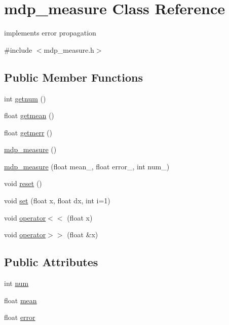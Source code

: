 \hypertarget{classmdp__measure}{
\section{mdp\_\-measure Class Reference}
\label{classmdp__measure}
}


implements error propagation  


{\ttfamily \#include $<$mdp\_\-measure.h$>$}\subsection*{Public Member Functions}
\begin{DoxyCompactItemize}
\item 
int \hyperlink{classmdp__measure_af4311b3d6f7aeedd30df26c805df74d9}{getnum} ()
\item 
float \hyperlink{classmdp__measure_a6ac1b96bc356ea6b614a672b06dab833}{getmean} ()
\item 
float \hyperlink{classmdp__measure_a7661cd0bdff2e5f4a2054ef5c3446cb1}{getmerr} ()
\item 
\hyperlink{classmdp__measure_a27caa03e148574a5e3e13b587212bc6a}{mdp\_\-measure} ()
\item 
\hyperlink{classmdp__measure_a861159da4e045611fa06b937c63d91ab}{mdp\_\-measure} (float mean\_\-, float error\_\-, int num\_)
\item 
void \hyperlink{classmdp__measure_ae03b11fdcba09eefb70134030b863cf6}{reset} ()
\item 
void \hyperlink{classmdp__measure_a5f6d47b2303eea323f511019404621a2}{set} (float x, float dx, int i=1)
\item 
void \hyperlink{classmdp__measure_ad1714e31ad9a1473c05f4aeeab9634e4}{operator$<$$<$} (float x)
\item 
void \hyperlink{classmdp__measure_a3d8873e8abbae44011ddcd69d23e0c9d}{operator$>$$>$} (float \&x)
\end{DoxyCompactItemize}
\subsection*{Public Attributes}
\begin{DoxyCompactItemize}
\item 
int \hyperlink{classmdp__measure_aca5ab38b4f8c43639b2754947c4e4b25}{num}
\item 
float \hyperlink{classmdp__measure_a105996437f8864a761c17dfa308a73f0}{mean}
\item 
float \hyperlink{classmdp__measure_ac0e564a7fdfa4785e8ca77569a2c37e4}{error}
\end{DoxyCompactItemize}
